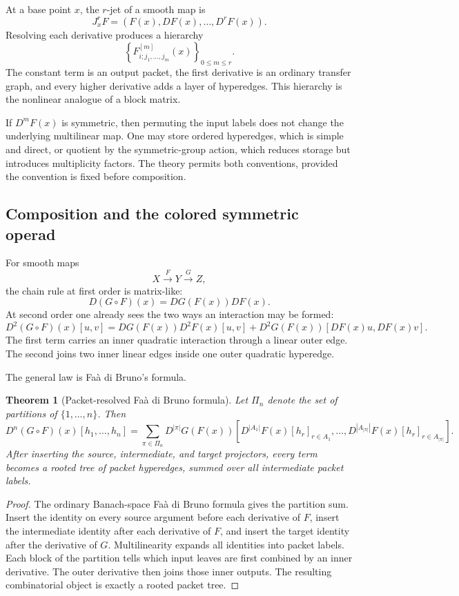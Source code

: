 \documentclass[11pt]{article}
\newtheorem{theorem}{Theorem}[section]
\theoremstyle{definition}
\theoremstyle{remark}
\begin{document}
At a base point $x$, the $r$-jet of a smooth map is
\[
J_x^rF
=
\left(F(x),DF(x),\ldots,D^rF(x)\right).
\]
Resolving each derivative produces a hierarchy
\[
\left\{
F^{[m]}_{i;j_1,\ldots,j_m}(x)
\right\}_{0\le m\le r}.
\]
The constant term is an output packet, the first derivative is an ordinary transfer graph, and every higher derivative adds a layer of hyperedges.  This hierarchy is the nonlinear analogue of a block matrix.

If $D^mF(x)$ is symmetric, then permuting the input labels does not change the underlying multilinear map.  One may store ordered hyperedges, which is simple and direct, or quotient by the symmetric-group action, which reduces storage but introduces multiplicity factors.  The theory permits both conventions, provided the convention is fixed before composition.

\subsection{Composition and the colored symmetric operad}

For smooth maps
\[
X\xrightarrow{F}Y\xrightarrow{G}Z,
\]
the chain rule at first order is matrix-like:
\[
D(G\circ F)(x)=DG(F(x))DF(x).
\]
At second order one already sees the two ways an interaction may be formed:
\[
D^2(G\circ F)(x)[u,v]
=
DG(F(x))D^2F(x)[u,v]
+
D^2G(F(x))[DF(x)u,DF(x)v].
\]
The first term carries an inner quadratic interaction through a linear outer edge.  The second joins two inner linear edges inside one outer quadratic hyperedge.

The general law is Fa\`a di Bruno's formula.

\begin{theorem}[Packet-resolved Fa\`a di Bruno formula]
Let $\Pi_n$ denote the set of partitions of $\{1,\ldots,n\}$.  Then
\[
D^n(G\circ F)(x)[h_1,\ldots,h_n]
=
\sum_{\pi\in\Pi_n}
D^{|\pi|}G(F(x))
\left[
D^{|A_1|}F(x)[h_r]_{r\in A_1},\ldots,
D^{|A_{|\pi|}|}F(x)[h_r]_{r\in A_{|\pi|}}
\right].
\]
After inserting the source, intermediate, and target projectors, every term becomes a rooted tree of packet hyperedges, summed over all intermediate packet labels.
\end{theorem}

\begin{proof}
The ordinary Banach-space Fa\`a di Bruno formula gives the partition sum.  Insert the identity on every source argument before each derivative of $F$, insert the intermediate identity after each derivative of $F$, and insert the target identity after the derivative of $G$.  Multilinearity expands all identities into packet labels.  Each block of the partition tells which input leaves are first combined by an inner derivative.  The outer derivative then joins those inner outputs.  The resulting combinatorial object is exactly a rooted packet tree.
\end{proof}
\end{document}
